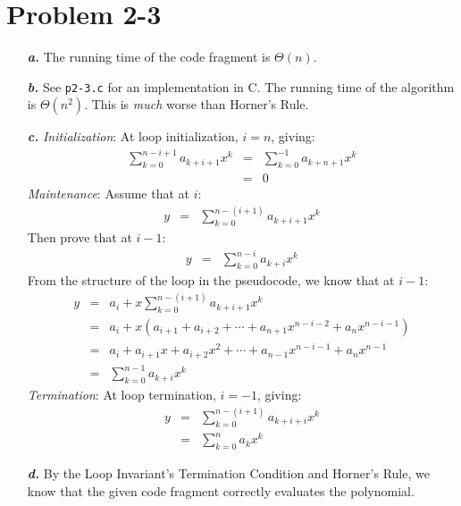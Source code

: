 \documentclass{article}
\begin{document}
\section*{Problem 2-3}

\noindent\begin{enumerate}
	\item[\textbf{\textit{a.}}]
		The running time of the code fragment is $\Theta(n)$.

	\item[\textbf{\textit{b.}}]
		See \texttt{p2-3.c} for an implementation in C. The running time of the algorithm is $\Theta(n^2)$. This is \textit{much} worse than Horner's Rule.

	\item[\textbf{\textit{c.}}]
		\textit{Initialization}: At loop initialization, $i=n$, giving:
		\begin{eqnarray*}
			\sum_{k=0}^{n-i+1} a_{k+i+1} x^k & = & \sum_{k=0}^{-1} a_{k+n+1} x^k \\
			& = & 0
		\end{eqnarray*}
		\textit{Maintenance}: Assume that at $i$:
		\begin{eqnarray*}
			y & = & \sum_{k=0}^{n-(i+1)} a_{k+i+1} x^k
		\end{eqnarray*}
		Then prove that at $i-1$:
		\begin{eqnarray*}
			y & = & \sum_{k=0}^{n-i} a_{k+i} x^k
		\end{eqnarray*}
		From the structure of the loop in the pseudocode, we know that at $i-1$:
		\begin{eqnarray*}
			y & = & a_i + x \sum_{k=0}^{n-(i+1)} a_{k+i+1} x^k \\
			& = & a_i + x \left ( a_{i+1} + a_{i+2} + \cdots + a_{n+1} x^{n-i-2} + a_n x^{n-i-1} \right ) \\
			& = & a_i + a_{i+1} x + a_{i+2} x^2 + \cdots + a_{n-1} x^{n-i-1} + a_n x^{n-1} \\
			& = & \sum_{k=0}^{n-1} a_{k+i} x^k
		\end{eqnarray*}
		\textit{Termination}: At loop termination, $i=-1$, giving:
		\begin{eqnarray*}
			y & = & \sum_{k=0}^{n-(i+1)} a_{k+i+i} x^k \\
			& = & \sum_{k=0}^n a_k x^k
		\end{eqnarray*}

	\item[\textbf{\textit{d.}}] By the Loop Invariant's Termination Condition and Horner's Rule, we know that the given code fragment correctly evaluates the polynomial.
\end{enumerate}
\end{document}
